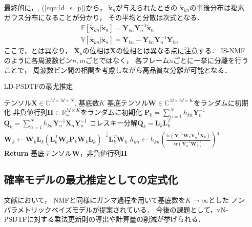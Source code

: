 最終的に，, (\ref{eqn:ld_s_p})から，
$\tilde{\bm{x}}_n$が与えられたときの
$\tilde{\bm{x}}_{kn}$の事後分布は複素ガウス分布になることが分かり，
その平均と分散は次式となる．
\begin{align}
 &\!\!\!\!\!\!\!\!
 \mathbb{E}[\tilde{\bm{x}}_{kn}|\tilde{\bm{x}}_n] 
 =
 \bm{Y}_{kn} \bm{Y}_n^{-1} \tilde{\bm{x}}_n
 \label{eqn:e_xn}
 \\
 &\!\!\!\!\!\!\!\!
 \mathbb{V}[\tilde{\bm{x}}_{kn}|\tilde{\bm{x}}_n] 
 =  
 \bm{Y}_{kn} - \bm{Y}_{kn} \bm{Y}_n^{-1} \bm{Y}_{kn}
 \label{eqn:v_xn}
\end{align}
ここで，とは異なり，
$\tilde{\bm{X}}_k$の位相は$\tilde{\bm{X}}$の位相とは異なる点に注意する．
IS-NMFのように各周波数ビン$n,m$ごとではなく，
各フレーム$n$ごとに一挙に分離を行うことで，
周波数ビン間の相関を考慮しながら高品質な分離が可能となる．

\begin{algorithm}[t]
\caption{LD-PSDTFの最尤推定}         
\label{ld-psdtf-ml}
\begin{algorithmic}[1]
\Require テンソル$\bm{X} \in \mathbb{C}^{M \times M \times N}$, 基底数$K$
\State 基底テンソル$\bm{W} \in \mathbb{C}^{M \times M \times K}$をランダムに初期化
\State 非負値行列$\bm{H} \in \mathbb{R}_+^{M \times K}$をランダムに初期化
\State $\bm{P}_k = \sum_{n=1}^{N} h_{kn} \bm{Y}_n^{-1}$
\State $\bm{Q}_k = \sum_{n=1}^{N} h_{kn} \bm{Y}_n^{-1} \bm{X}_n \bm{Y}_n^{-1}$
\State コレスキー分解$\bm{Q}_k = \bm{L}_k \bm{L}_k^T$
\State $\bm{W}_k 
 \gets
 \bm{W}_k \bm{L}_k(\bm{L}_k^T \bm{W}_k \bm{P}_k \bm{W}_k \bm{L}_k)^{-\frac{1}{2}}\bm{L}_k^T \bm{W}_k$
\State  $h_{kn} \gets h_{kn}
 \left(\frac{\mbox{tr}\!\left(\bm{Y}_n^{-1} \bm{W}_k \bm{Y}_n^{-1} \bm{X}_n\right)}
            {\mbox{tr}\!\left(\bm{Y}_n^{-1} \bm{W}_k \right)}\right)^{\frac{1}{2}}$
\EndWhile\\
{\bf Return} 基底テンソル$\bm{W}$，非負値行列$\bm{H}$
\end{algorithmic}
\end{algorithm}

\subsection{確率モデルの最尤推定としての定式化}

文献\cite{yoshii:ismir:2013,yoshii:icml:2013}において，
NMFと同様にガンマ過程を用いて基底数を$K \rightarrow \infty$とした
ノンパラメトリックベイズモデルが提案されている．
今後の課題として，vN-PSDTFに対する乗法更新則の導出や計算量の削減が挙げられる．




